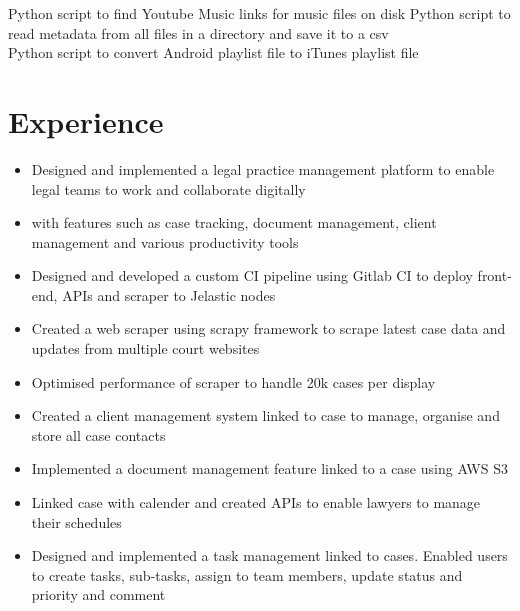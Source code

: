 \documentclass[]{resume}
\begin{document}
\begin{minipage}[t]{0.33\textwidth}
Python script to find Youtube Music links for music files on disk
Python script to read metadata from all files in a directory and save it to a csv \\
Python script to convert Android playlist file to iTunes playlist file

%
%

\end{minipage} 
\hfill
\begin{minipage}[t]{0.66\textwidth} 


\section{Experience}

\begin{itemize}
    \item Designed and implemented a legal practice management platform to enable legal teams to work and collaborate digitally
    \item with features such as case tracking, document management, client management and various productivity tools
    \item Designed and developed a custom CI pipeline using Gitlab CI to deploy front-end, APIs and scraper to Jelastic nodes
    \item Created a web scraper using scrapy framework to scrape latest case data and updates from multiple court websites
    \item Optimised performance of scraper to handle 20k cases per display
    \item Created a client management system linked to case to manage, organise and store all case contacts
    \item Implemented a document management feature linked to a case using AWS S3
    \item Linked case with calender and created APIs to enable lawyers to manage their schedules
    \item Designed and implemented a task management linked to cases. Enabled users to create tasks, sub-tasks, assign to team members, update status and priority and comment
\end{itemize}
\sectionsep


\end{minipage}
\end{document}
